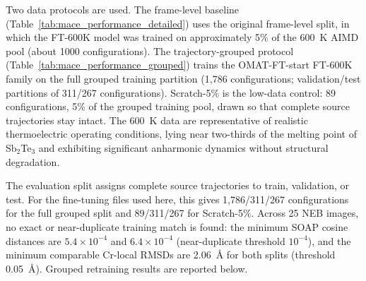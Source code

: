 \documentclass[pdflatex,sn-mathphys-num]{sn-jnl}%
\theoremstyle{thmstyleone}%
\theoremstyle{thmstyletwo}%
\theoremstyle{thmstylethree}%
\begin{document}
Two data protocols are used. The frame-level baseline (Table~\ref{tab:mace_performance_detailed}) uses the original frame-level split, in which the FT-600K model was trained on approximately 5\% of the 600~K AIMD pool (about 1000 configurations). The trajectory-grouped protocol (Table~\ref{tab:mace_performance_grouped}) trains the OMAT-FT-start FT-600K family on the full grouped training partition (1,786 configurations; validation/test partitions of 311/267 configurations). Scratch-5\% is the low-data control: 89 configurations, 5\% of the grouped training pool, drawn so that complete source trajectories stay intact. The 600~K data are representative of realistic thermoelectric operating conditions, lying near two-thirds of the melting point of Sb$_2$Te$_3$ and exhibiting significant anharmonic dynamics without structural degradation.

The evaluation split assigns complete source trajectories to train, validation, or test. For the fine-tuning files used here, this gives 1,786/311/267 configurations for the full grouped split and 89/311/267 for Scratch-5\%. Across 25 NEB images, no exact or near-duplicate training match is found: the minimum SOAP cosine distances are $5.4\times10^{-4}$ and $6.4\times10^{-4}$ (near-duplicate threshold $10^{-4}$), and the minimum comparable Cr-local RMSDs are 2.06~\AA{} for both splits (threshold 0.05~\AA). Grouped retraining results are reported below.





\end{document}
